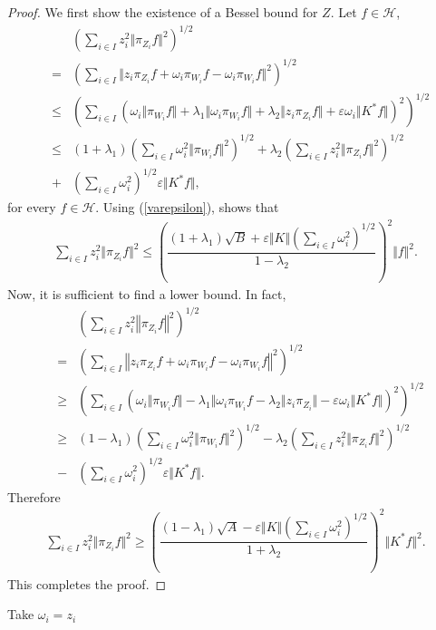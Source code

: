 \documentclass{birkjour}
\theoremstyle{definition}
\theoremstyle{remark}
\numberwithin{equation}{section}
\begin{document}
\begin{proof}
We first show the existence of a Bessel bound for $Z$. Let  $f\in \mathcal{H}$, 
\begin{eqnarray*}
&&\left(\sum_{i\in I}
z_{i}^{2}\Vert \pi_{Z_{i}}f\Vert^{2}\right)^{1/2}\\
&=&\left(\sum_{i\in I}
\Vert z_{i}\pi_{Z_{i}}f+\omega_{i}\pi_{W_{i}}f-\omega_{i}\pi_{W_{i}}f\Vert^{2}\right)^{1/2}\\
&\leq& \left(\sum_{i\in I} \left( \omega_{i}\Vert
\pi_{W_{i}}f\Vert+\lambda_{1}\Vert
\omega_{i}\pi_{W_{i}}f\Vert+\lambda_{2}\Vert
z_{i}\pi_{Z_{i}}f\Vert+\varepsilon \omega_{i}\Vert
K^{*}f\Vert \right)^{2}\right)^{1/2}\\
&\leq& (1+\lambda_{1})\left(\sum_{i\in
I} \omega_{i}^{2}\Vert
\pi_{W_{i}}f\Vert^{2}\right)^{1/2}+\lambda_{2}\left(\sum_{i\in I} z_{i}^{2}\Vert \pi_{Z_{i}}f\Vert^{2}\right)^{1/2}\\
&+& \left(\sum_{i\in I}\omega_{i}^{2}\right)^{1/2}\varepsilon \Vert K^{*}f\Vert,  \end{eqnarray*}
for every $f\in \mathcal{H}$. Using (\ref{varepsilon}), shows that \begin{eqnarray*} \sum_{i\in I} z_{i}^{2}\Vert \pi_{Z_{i}}f\Vert^{2}
\leq \left(\dfrac{(1+\lambda_{1})\sqrt{B}+\varepsilon \Vert K\Vert
\left(\sum_{i\in I}\omega_{i}^{2}\right)^{1/2}}{1-\lambda_{2}}\right)^{2}
\Vert f\Vert^{2}.
\end{eqnarray*}
Now, it is sufficient to find a lower bound. In fact,
\begin{eqnarray*} &&\left(\sum_{i\in I} z_{i}^{2}\left\Vert
\pi_{Z_{i}}f\right\Vert^{2}\right)^{1/2}\\
&=& \left(\sum_{i\in I} \left\Vert
z_{i}\pi_{Z_{i}}f+\omega_{i}\pi_{W_{i}}f-\omega_{i}\pi_{W_{i}}f\right\Vert^{2}\right)^{1/2}
\\ &\geq& \left(\sum_{i\in I} \left(\omega_{i}\Vert
\pi_{W_{i}}f\Vert-\lambda_{1}\Vert \omega_{i}\pi_{W_{i}}f-\lambda_{2}\Vert
z_{i}\pi_{Z_{i}}\Vert-\varepsilon \omega_{i}\Vert
K^{*}f\Vert\right)^{2}\right)^{1/2}\\ &\geq& (1-\lambda_{1})\left(\sum_{i\in
I} \omega_{i}^{2}\Vert
\pi_{W_{i}}f\Vert^{2}\right)^{1/2}-\lambda_{2}\left(\sum_{i\in I}
z_{i}^{2}\Vert \pi_{Z_{i}}f\Vert^{2}\right)^{1/2}\\ &-& \left(\sum_{i\in
I}\omega_{i}^{2}\right)^{1/2}\varepsilon \Vert K^{*}f\Vert. \end{eqnarray*}
Therefore  \begin{eqnarray*} \sum_{i\in I} z_{i}^{2}\Vert
\pi_{Z_{i}}f\Vert^{2} \geq \left(\dfrac{(1-\lambda_{1})\sqrt{A}-\varepsilon
\Vert K\Vert \left(\sum_{i\in
I}\omega_{i}^{2}\right)^{1/2}}{1+\lambda_{2}}\right)^{2} \Vert
K^{*}f\Vert^{2}.
\end{eqnarray*} This completes the proof. \end{proof} Take $\omega_{i}=z_{i}$
\end{document}
